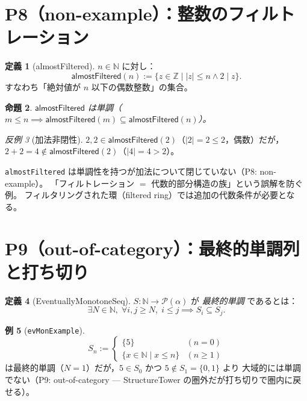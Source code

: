 \documentclass[a4paper,11pt]{ltjsarticle}
\theoremstyle{definition}
\newtheorem{definition}{定義}[section]
\newtheorem{example}[definition]{例}
\theoremstyle{plain}
\newtheorem{proposition}[definition]{命題}
\theoremstyle{remark}
\newtheorem{counterexample}[definition]{反例}
\begin{document}
\section{P8（non-example）：整数のフィルトレーション}\label{sec:integer}

\begin{definition}[almostFiltered]
$n \in \mathbb{N}$ に対し：
\[
  \mathsf{almostFiltered}(n) := \{z \in \mathbb{Z} \mid |z| \leq n \wedge 2 \mid z\}.
\]
すなわち「絶対値が $n$ 以下の偶数整数」の集合。
\end{definition}

\begin{proposition}
$\mathsf{almostFiltered}$ は単調（$m \leq n \implies
\mathsf{almostFiltered}(m) \subseteq \mathsf{almostFiltered}(n)$）。
\end{proposition}

\begin{counterexample}[加法非閉性]\label{ex:not-add-closed}
$2, 2 \in \mathsf{almostFiltered}(2)$（$|2| = 2 \leq 2$，偶数）だが，
$2 + 2 = 4 \notin \mathsf{almostFiltered}(2)$（$|4| = 4 > 2$）。
\end{counterexample}

\begin{counterpointbox}
\texttt{almostFiltered} は単調性を持つが加法について閉じていない（P8: non-example）。
「フィルトレーション $=$ 代数的部分構造の族」という誤解を防ぐ例。
フィルタリングされた環（filtered ring）では追加の代数条件が必要となる。
\end{counterpointbox}

\section{P9（out-of-category）：最終的単調列と打ち切り}\label{sec:evmon}

\begin{definition}[EventuallyMonotoneSeq]
$S : \mathbb{N} \to \mathcal{P}(\alpha)$ が \emph{最終的単調} であるとは：
\[
  \exists N \in \mathbb{N},\; \forall i, j \geq N,\; i \leq j \implies S_i \subseteq S_j.
\]
\end{definition}

\begin{example}[\texttt{evMonExample}]
\[
  S_n :=
  \begin{cases}
    \{5\} & (n = 0) \\
    \{x \in \mathbb{N} \mid x \leq n\} & (n \geq 1)
  \end{cases}
\]
は最終的単調（$N = 1$）だが，$5 \in S_0$ かつ $5 \notin S_1 = \{0, 1\}$ より
大域的には単調でない（P9: out-of-category --- StructureTower の圏外だが打ち切りで圏内に戻せる）。
\end{example}
\end{document}
